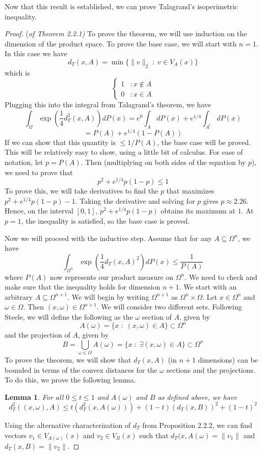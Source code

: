 \documentclass[12pt]{report}
\newtheorem{lem}[thm]{Lemma}
\newcommand{\be}{\begin{equation}}
\newcommand{\ee}{\end{equation}}
\theoremstyle{definition}
\begin{document}
Now that this result is established, we can prove Talagrand's isoperimetric inequality.
\begin{proof}{(\em of Theorem 2.2.1)}
To prove the theorem, we will use induction on the dimension of the product space.  To prove the base case, we will start with $n=1$.  In this case we have 
$$
d_T(x,A)=\min \{\|v\|_2\; : \;v\in V_A(x)\}
$$
which is 
$$
\left\{
     \begin{array}{lr}
       1 & : x \notin A\\
       0 & : x \in A
     \end{array}
   \right.
$$
Plugging this into the integral from Talagrand's theorem, we have 
$$
\int_{\Omega}\exp\left(\frac{1}{4}d_T^2(x,A)\right)dP(x)=e^0\int_A dP(x)+e^{1/4}\int_{A^c}dP(x)
$$
$$
=P(A)+e^{1/4}(1-P(A))
$$
If we can show that this quantity is $\leq 1/P(A)$, the base case will be proved.  This will be relatively easy to show, using a little bit of calculus.  For ease of notation, let $p=P(A)$.  Then (multiplying on both sides of the equation by $p$), we need to prove that 
$$
p^2+e^{1/4}p(1-p)\leq 1
$$
To prove this, we will take derivatives to find the $p$ that maximizes $p^2+e^{1/4}p(1-p)-1$.
Taking the derivative and solving for $p$ gives $p\approx 2.26$.  Hence, on the interval $[0,1]$, $p^2+e^{1/4}p(1-p)$ obtains its maximum at $1$.  At $p=1$, the inequality is satisfied, so the base case is proved.  

Now we will proceed with the inductive step.  Assume that for any $A\subseteq\Omega^n$, we have 
$$
\int_{\Omega^n}\exp\left(\frac{1}{4}d_T(x,A)^2\right)dP(x)\leq \frac{1}{P(A)}
$$
where $P(A)$ now represents our product measure on $\Omega^n$.  We need to check and make sure that the inequality holds for dimension $n+1$. We start with an arbitrary $A\subseteq \Omega^{n+1}$.  We will begin by writing $\Omega^{n+1}$ as $\Omega^n\times \Omega$.  Let $x\in\Omega^n$ and $\omega\in \Omega$.  Then $(x,\omega)\in\Omega^{n+1}$.  We will consider two different sets.  Following Steele, we will define the following as the $\omega$ section of $A$, given by 
$$
A(\omega)=\{x \; :\;(x,\omega)\in A\}\subset\Omega^n
$$
and the projection of $A$, given by 
$$
B=\bigcup_{\omega\in\Omega}A(\omega)=\{x\; :\; \exists  (x,\omega)\in A\}\subset\Omega^n
$$
To prove the theorem, we will show that $d_T(x,A)$ (in $n+1$ dimensions) can be bounded in terms of the convex distances for the $\omega$ sections and the projections.  To do this, we prove the following lemma.
\begin{lem}
For all $0\leq t\leq 1$ and $A(\omega)$ and $B$ as defined above, we have
\be 
d_T^2((x,\omega), A)\leq t(d_T^2(x,A(\omega)))+(1-t)(d_T(x,B))^2 +(1-t)^2
\ee
\end{lem}
Using the alternative characterization of $d_T$ from Proposition 2.2.2, we can find vectors $v_1\in V_{A(\omega)}(x)$ and $v_2\in V_B(x)$ such that $d_T(x,A(\omega)=\|v_1\|$ and $d_T(x,B)=\|v_2\|$.  


\end{proof}
\end{document}
